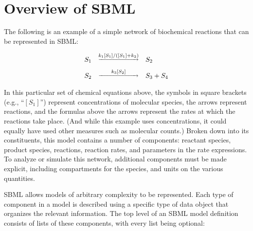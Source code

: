 
\section{Overview of SBML}
\label{sec:overview}

The following is an example of a simple network of
biochemical reactions that can be represented in SBML:
\begin{linenomath}
  \begin{equation*}
    \begin{array}{@{}ccl@{}}
      S_1 & \overset{\underrightarrow{k_1 [S_1] / ([S_1] + k_2)}}{} & S_2 \\ \\[-5pt]
      S_2 & \overset{\underrightarrow{\rule{0.26in}{0pt}k_3 [S_2]\rule{0.26in}{0pt}}}{} & S_3 + S_4
    \end{array}
  \end{equation*}
\end{linenomath}
In this particular set of chemical equations above, the symbols in
square brackets (e.g., ``$[S_1]$'') represent concentrations of molecular
species, the arrows represent reactions, and the formulas above
the arrows represent the rates at which the reactions take place.
(And while this example uses concentrations, it could equally have used
other measures such as molecular counts.)
Broken down into its constituents, this model contains a number of
components: reactant species, product species, reactions,
reaction rates, and parameters in the rate expressions.  To analyze or
simulate this network, additional components must be made
explicit, including compartments for the species, and units on the
various quantities.

SBML allows models of arbitrary complexity to be represented.
Each type of component in a model is described using a specific
type of data object that organizes the relevant information.
The top level of an SBML model definition consists of lists of
these components, with every list being optional:

